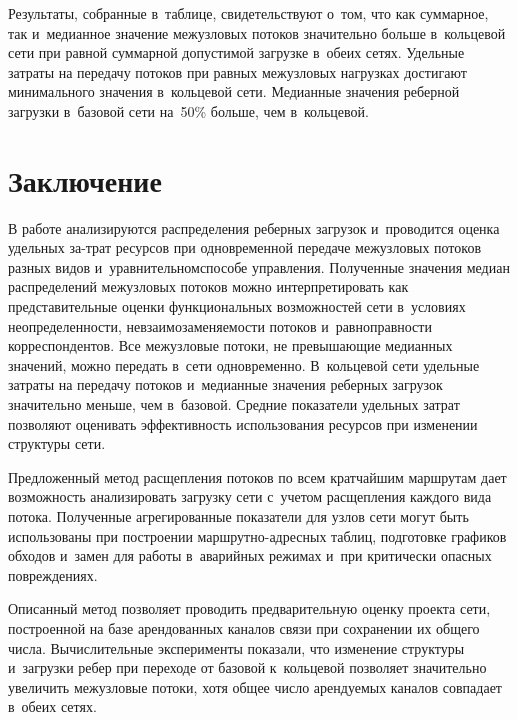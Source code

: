 \begin{multicols}{2}
{}


Результаты, собранные в~таб\-ли\-це, свидетельствуют о~том, что как суммарное, так 
и~медианное значение межузловых потоков значительно больше в~коль\-це\-вой сети при 
рав\-ной сум\-мар\-ной допустимой за\-груз\-ке в~обеих сетях.
Удельные за\-тра\-ты на передачу потоков при рав\-ных межузловых на\-груз\-ках достигают 
минимального значения в~кольцевой сети. Медианные значения реберной за\-груз\-ки 
в~базовой сети на~50\% больше, чем в~кольцевой. 



\section{Заключение}


В работе анализируются распределения реберных за\-гру\-зок и~проводится оценка 
удельных за-\linebreak трат ресурсов при одновременной передаче межузловых потоков разных 
видов и~урав\-ни\-тель\-ном\linebreak способе управ\-ле\-ния. Полученные значения медиан  
распределений межузловых потоков мож\-но интерпретировать как пред\-ста\-ви\-тель\-ные 
оценки функциональных возможностей сети в~условиях не\-опре\-де\-лен\-ности, 
не\-вза\-и\-мо\-за\-ме\-ня\-е\-мости потоков и~\mbox{рав\-но\-прав\-ности} корреспондентов. Все межузловые 
потоки, не пре\-вы\-ша\-ющие медианных значений,
мож\-но передать в~сети одновременно. В~кольцевой сети удельные за\-тра\-ты на 
передачу потоков и~медианные значения ре\-бер\-ных загрузок значительно меньше, чем 
в~базовой. Сред\-ние показатели удельных за\-трат позволяют
оценивать эф\-фек\-тив\-ность использования ресурсов при изменении структуры \mbox{сети}.

Предложенный метод расщепления потоков по всем крат\-чай\-шим марш\-ру\-там дает 
воз\-мож\-ность анализировать за\-груз\-ку сети с~учетом рас\-щеп\-ле\-ния каж\-до\-го вида 
потока. Полученные агрегированные показатели для узлов сети могут быть 
использованы при по\-стро\-ении марш\-рут\-но-ад\-рес\-ных таб\-лиц, подготовке графиков 
обходов и~замен для работы в~аварийных режимах и~при критически опас\-ных 
по\-вреж\-де\-ниях.

Описанный метод позволяет проводить пред\-ва\-ри\-тель\-ную оцен\-ку проекта сети, 
по\-стро\-ен\-ной на базе арендованных каналов связи при со\-хра\-не\-нии их общего чис\-ла. 
Вы\-чис\-ли\-тель\-ные эксперименты показали, что изменение структуры и~за\-груз\-ки ребер 
при переходе от базовой к~кольцевой поз\-во\-ля\-ет значительно увеличить межузловые 
потоки, хотя общее чис\-ло арен\-ду\-емых каналов совпадает в~обеих се\-тях. 


\end{multicols}
